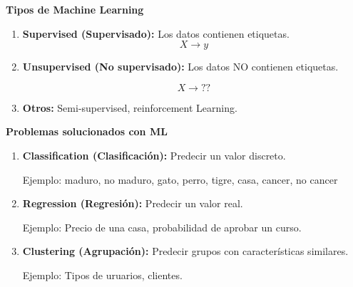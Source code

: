 \documentclass[english,svgnames,notes=hide,12pt]{beamer}
\begin{document}
\begin{frame}
    \textbf{Tipos de Machine Learning}
    \begin{enumerate}
        \item \textbf{Supervised (Supervisado):} Los datos contienen etiquetas.
        $$X \rightarrow y $$
        \item \textbf{Unsupervised (No supervisado):} Los datos NO contienen etiquetas.
        
        $$ X \rightarrow ?? $$
        \item \textbf{Otros:} Semi-supervised, reinforcement Learning.
    \end{enumerate}

\end{frame}


\begin{frame}
    \textbf{Problemas solucionados con ML}
    \begin{enumerate}
        \item \textbf{Classification (Clasificaci\'on):} Predecir un valor discreto.

        Ejemplo: {maduro, no maduro}, {gato, perro, tigre, casa}, {cancer, no cancer}

    \item \textbf{Regression (Regresión):} Predecir un valor real.

        Ejemplo: Precio de una casa, probabilidad de aprobar un curso.

    \item \textbf{Clustering (Agrupación):} Predecir grupos con características similares.

        Ejemplo: Tipos de uruarios, clientes.
    \end{enumerate}

\end{frame}
\end{document}

